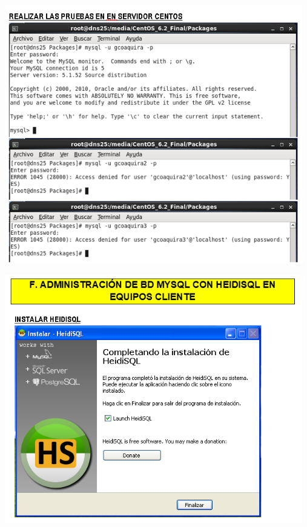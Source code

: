 \begin{itemize}
	\begin{center}
		\includegraphics[width=13cm]{./Imagenes/21a}
		\end{center}
\end{itemize} 

\begin{itemize}
	\begin{center}
		\includegraphics[width=13cm]{./Imagenes/22a}
		\end{center}
\end{itemize} 

